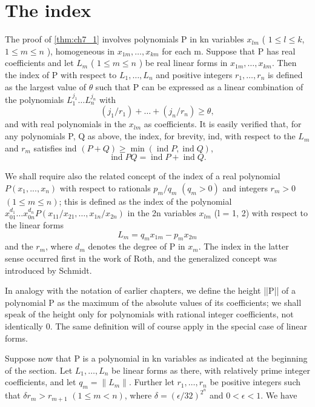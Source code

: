 \section{The index}\label{sec:ch7_3}

The proof of \autoref{thm:ch7_1} involves polynomials P in kn variables  $x_{lm}$  ( $1 \le l \le k$,  $1 \le m \le n$ ), homogeneous in  $x_{1m}, \ldots, x_{km}$  for each m. Suppose that P has real coefficients and let  $L_m$  ( $1 \le m \le n$ ) be real linear forms in  $x_{1m}, \ldots, x_{km}$. Then the index of P with respect to  $L_1, \ldots, L_n$  and positive integers  $r_1, \ldots, r_n$  is defined as the largest value of  $\theta$  such that P can be expressed as a linear combination of the polynomials  $L_1^{j_1} \ldots L_n^{j_n}$  with
\[(j_1/r_1) + \ldots + (j_n/r_n) \geq \theta,\]
and with real polynomials in the  $x_{lm}$  as coefficients. It is easily verified that, for any polynomials P, Q as above, the index, for brevity, ind, with respect to the  $L_m$  and  $r_m$  satisfies ind  $(P+Q) \ge \min (\operatorname{ind} P, \operatorname{ind} Q)$,
\[\operatorname{ind} PQ = \operatorname{ind} P + \operatorname{ind} Q.\]

We shall require also the related concept of the index of a real polynomial  $P(x_1, ..., x_n)$  with respect to rationals  $p_m/q_m$   $(q_m > 0)$  and integers  $r_m > 0$   $(1 \le m \le n)$; this is defined as the index of the polynomial  $x_{01}^{d_1} \dots x_{0n}^{d_n} P(x_{11}/x_{21}, \dots, x_{1n}/x_{2n})$  in the 2n variables  $x_{lm}$  (l = 1, 2) with respect to the linear forms
\[L_m = q_m x_{1m} - p_m x_{2m}\]
and the  $r_m$, where  $d_m$  denotes the degree of P in  $x_m$. The index in the latter sense occurred first in the work of Roth, and the generalized concept was introduced by Schmidt.

In analogy with the notation of earlier chapters, we define the height ||P|| of a polynomial P as the maximum of the absolute values of its coefficients; we shall speak of the height only for polynomials with rational integer coefficients, not identically 0. The same definition will of course apply in the special case of linear forms.

Suppose now that P is a polynomial in kn variables as indicated at the beginning of the section. Let  $L_1, \dots, L_n$  be linear forms as there, with relatively prime integer coefficients, and let  $q_m = \|L_m\|$. Further let  $r_1, \dots, r_n$  be positive integers such that  $\delta r_m > r_{m+1}$   $(1 \le m < n)$, where  $\delta = (\epsilon/32)^{2^n}$  and  $0 < \epsilon < 1$. We have

